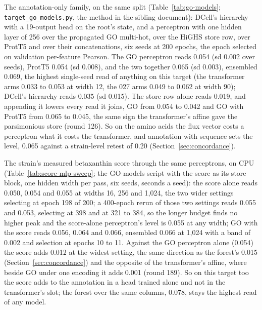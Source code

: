 The annotation-only family, on the same split (Table~\ref{tab:go-models};
\texttt{target\_go\_models.py}, the method in the sibling document): DCell's hierarchy
with a 19-output head on the root's state, and a perceptron with one hidden layer of
256 over the propagated GO multi-hot, over the HiGHS store row, over ProtT5 and over
their concatenations, six seeds at 200 epochs, the epoch selected on validation
per-feature Pearson. The GO perceptron reads 0.054 (sd 0.002 over seeds), ProtT5 0.054
(sd 0.008), and the two together 0.065 (sd 0.003), ensembled 0.069, the highest
single-seed read of anything on this target (the transformer arms 0.033 to 0.053 at
width 12, the 027 arms 0.049 to 0.062 at width 90); DCell's hierarchy reads 0.035 (sd
0.015). The store row alone reads 0.019, and appending it lowers every read it joins,
GO from 0.054 to 0.042 and GO with ProtT5 from 0.065 to 0.045, the same sign the
transformer's affine gave the parsimonious store (round 126). So on the amino acids the
flux vector costs a perceptron what it costs the transformer, and annotation with
sequence sets the level, 0.065 against a strain-level retest of 0.20
(Section~\ref{sec:concordance}).



The strain's measured betaxanthin score through the same perceptrons, on CPU
(Table~\ref{tab:score-mlp-sweep}; the GO-models script with the score as its store
block, one hidden width per pass, six seeds, seconds a seed): the score alone reads
0.050, 0.054 and 0.055 at widths 16, 256 and 1,024, the two wider settings selecting
at epoch 198 of 200; a 400-epoch rerun of those two settings reads 0.055 and 0.053,
selecting at 398 and at 321 to 384, so the longer budget finds no higher peak and
the score-alone perceptron's level is 0.055 at any width; GO with the score reads 0.056,
0.064 and 0.066, ensembled 0.066 at 1,024 with a band of 0.002 and selection at epochs
10 to 11. Against the GO perceptron alone (0.054) the score adds 0.012 at the widest
setting, the same direction as the forest's 0.015 (Section~\ref{sec:concordance}) and
the opposite of the transformer's affine, where beside GO under one encoding it adds
0.001 (round 189). So on this target too the score adds to the annotation in a head
trained alone and not in the transformer's slot; the forest over the same columns,
0.078, stays the highest read of any model.


